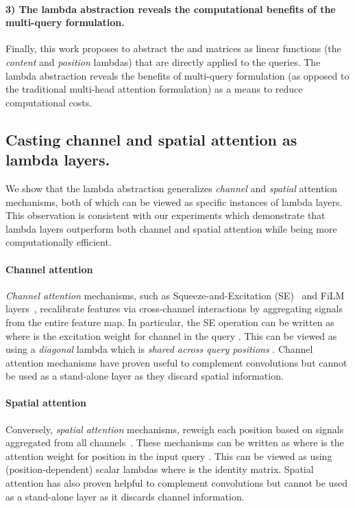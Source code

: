\documentclass{article} \usepackage{iclr2021_conference,times}
\begin{document}
\paragraph{3) The lambda abstraction reveals the computational benefits of the multi-query formulation.}
Finally, this work proposes to abstract the  and  matrices as linear functions (the \emph{content} and \emph{position} lambdas) that are directly applied to the queries.
The lambda abstraction reveals the benefits of multi-query formulation (as opposed to the traditional multi-head attention formulation) as a means to reduce computational costs.

\vspace{-0.1cm}
\subsection{Casting channel and spatial attention as lambda layers.~\label{sec:channel_spatial_attention}}
We show that the lambda abstraction generalizes \emph{channel} and \emph{spatial} attention mechanisms, both of which can be viewed as specific instances of lambda layers.
This observation is consistent with our experiments which demonstrate that lambda layers outperform both channel and spatial attention while being more computationally efficient.

\paragraph{Channel attention}
\emph{Channel attention} mechanisms, such as Squeeze-and-Excitation (SE)~\citep{hu2017squeeze,hu2018gather} and FiLM layers~\citep{perez2017film}, recalibrate features via cross-channel interactions by aggregating signals from the entire feature map.
In particular, the SE operation can be written as  where  is the excitation weight for channel  in the query .
This can be viewed as using a \emph{diagonal} lambda which is \emph{shared across query positions} .
Channel attention mechanisms have proven useful to complement convolutions but cannot be used as a stand-alone layer as they discard spatial information.

\paragraph{Spatial attention}
Conversely, \emph{spatial attention} mechanisms, reweigh each position based on signals aggregated from all channels~\citep{xu2015show,park2018bam,woo2018cbam}.
These mechanisms can be written as  where  is the attention weight for position  in the input query .
This can be viewed as using (position-dependent) scalar lambdas  where  is the identity matrix.
Spatial attention has also proven helpful to complement convolutions but cannot be used as a stand-alone layer as it discards channel information.
\end{document}

